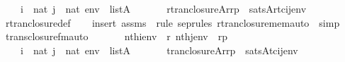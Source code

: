 \begin{isabellebody}
\ \ \ \ {\isachardoublequoteopen}i\ {\isasymin}\ nat{\isachardoublequoteclose}\ {\isachardoublequoteopen}j\ {\isasymin}\ nat{\isachardoublequoteclose}\ {\isachardoublequoteopen}env\ {\isasymin}\ list{\isacharparenleft}{\kern0pt}A{\isacharparenright}{\kern0pt}{\isachardoublequoteclose}\isanewline
\ \ \isanewline
\ \ \ \ {\isachardoublequoteopen}rtran{\isacharunderscore}{\kern0pt}closure{\isacharparenleft}{\kern0pt}{\isacharhash}{\kern0pt}{\isacharhash}{\kern0pt}A{\isacharcomma}{\kern0pt}r{\isacharcomma}{\kern0pt}rp{\isacharparenright}{\kern0pt}\ {\isasymlongleftrightarrow}\ sats{\isacharparenleft}{\kern0pt}A{\isacharcomma}{\kern0pt}{\isacharquery}{\kern0pt}rtc{\isacharparenleft}{\kern0pt}i{\isacharcomma}{\kern0pt}j{\isacharparenright}{\kern0pt}{\isacharcomma}{\kern0pt}env{\isacharparenright}{\kern0pt}{\isachardoublequoteclose}\isanewline
%
\isadelimproof
\ \ %
\endisadelimproof
%
\isatagproof
{}\isamarkupfalse%
\ rtran{\isacharunderscore}{\kern0pt}closure{\isacharunderscore}{\kern0pt}def\isanewline
\ \ \isamarkupfalse%
\ {\isacharparenleft}{\kern0pt}insert\ assms\ {\isacharsemicolon}{\kern0pt}\ {\isacharparenleft}{\kern0pt}rule\ sep{\isacharunderscore}{\kern0pt}rules\ rtran{\isacharunderscore}{\kern0pt}closure{\isacharunderscore}{\kern0pt}mem{\isacharunderscore}{\kern0pt}auto\ {\isacharbar}{\kern0pt}\ simp{\isacharparenright}{\kern0pt}{\isacharplus}{\kern0pt}{\isacharparenright}{\kern0pt}%
\endisatagproof
{\isafoldproof}%
%
\isadelimproof
\isanewline
%
\endisadelimproof
\isanewline
{}\isamarkupfalse%
\ trans{\isacharunderscore}{\kern0pt}closure{\isacharunderscore}{\kern0pt}fm{\isacharunderscore}{\kern0pt}auto{\isacharcolon}{\kern0pt}\isanewline
\ \ \isanewline
\ \ \ \ {\isachardoublequoteopen}nth{\isacharparenleft}{\kern0pt}i{\isacharcomma}{\kern0pt}env{\isacharparenright}{\kern0pt}\ {\isacharequal}{\kern0pt}\ r{\isachardoublequoteclose}\ {\isachardoublequoteopen}nth{\isacharparenleft}{\kern0pt}j{\isacharcomma}{\kern0pt}env{\isacharparenright}{\kern0pt}\ {\isacharequal}{\kern0pt}\ rp{\isachardoublequoteclose}\isanewline
\ \ \ \ {\isachardoublequoteopen}i\ {\isasymin}\ nat{\isachardoublequoteclose}\ {\isachardoublequoteopen}j\ {\isasymin}\ nat{\isachardoublequoteclose}\ {\isachardoublequoteopen}env\ {\isasymin}\ list{\isacharparenleft}{\kern0pt}A{\isacharparenright}{\kern0pt}{\isachardoublequoteclose}\isanewline
\ \ \isanewline
\ \ \ \ {\isachardoublequoteopen}tran{\isacharunderscore}{\kern0pt}closure{\isacharparenleft}{\kern0pt}{\isacharhash}{\kern0pt}{\isacharhash}{\kern0pt}A{\isacharcomma}{\kern0pt}r{\isacharcomma}{\kern0pt}rp{\isacharparenright}{\kern0pt}\ {\isasymlongleftrightarrow}\ sats{\isacharparenleft}{\kern0pt}A{\isacharcomma}{\kern0pt}{\isacharquery}{\kern0pt}tc{\isacharparenleft}{\kern0pt}i{\isacharcomma}{\kern0pt}j{\isacharparenright}{\kern0pt}{\isacharcomma}{\kern0pt}env{\isacharparenright}{\kern0pt}{\isachardoublequoteclose}\isanewline

\end{isabellebody}
